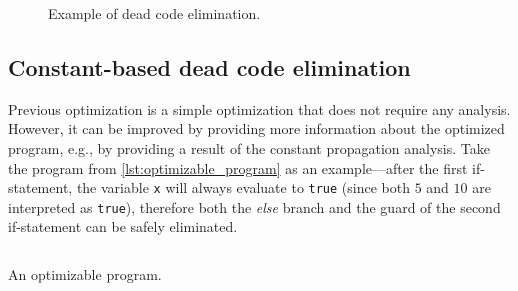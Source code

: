\documentclass[thesis=M,english]{FITthesis}[2019/12/23]
\begin{document}
\begin{figure}
	\centering
	\hspace{1em}
	\caption{Example of dead code elimination.}
	\label{fig:dead_code_elim}
\end{figure}
\pagebreak

\subsection{Constant-based dead code elimination}
Previous optimization is a simple optimization that does not require any analysis. However, it can be improved by providing more information about the optimized program, e.g., by providing a result of the constant propagation analysis. Take the program from \autoref{lst:optimizable_program} as an example---after the first if-statement, the variable \texttt{x} will always evaluate to \texttt{true} (since both $5$ and $10$ are interpreted as \texttt{true}), therefore both the \emph{else} branch and the guard of the second if-statement can be safely eliminated.

\begin{listing}[H]
    \centering
	\inputminted[tabsize=2,breaklines,bgcolor=codebg,escapeinside=||]{python}{snippets/optimizable_program.m}
	\caption{An optimizable program.}
	\label{lst:optimizable_program}
\end{listing}
\end{document}

